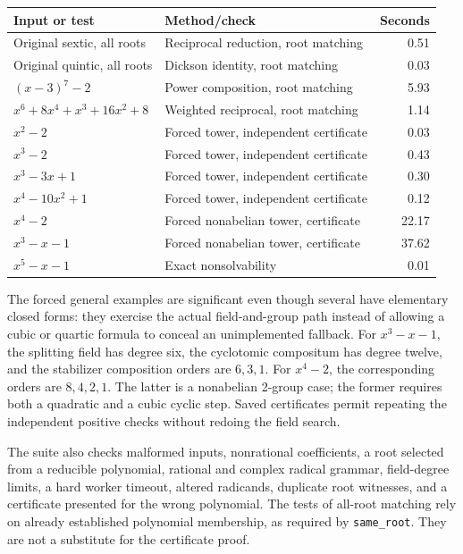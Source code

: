 \documentclass[11pt,a4paper]{article}
\theoremstyle{definition}
\theoremstyle{remark}
\newcommand{\code}[1]{\texttt{#1}}
\begin{document}
\begin{center}\small
\begin{tabular}{@{}p{}p{}r@{}}
\toprule
Input or test & Method/check & Seconds\\
\midrule
Original sextic, all roots & Reciprocal reduction, root matching & 0.51\\
Original quintic, all roots & Dickson identity, root matching & 0.03\\
$(x-3)^7-2$ & Power composition, root matching & 5.93\\
$x^6+8x^4+x^3+16x^2+8$ & Weighted reciprocal, root matching & 1.14\\
$x^2-2$ & Forced tower, independent certificate & 0.03\\
$x^3-2$ & Forced tower, independent certificate & 0.43\\
$x^3-3x+1$ & Forced tower, independent certificate & 0.30\\
$x^4-10x^2+1$ & Forced tower, independent certificate & 0.12\\
$x^4-2$ & Forced nonabelian tower, certificate & 22.17\\
$x^3-x-1$ & Forced nonabelian tower, certificate & 37.62\\
$x^5-x-1$ & Exact nonsolvability & 0.01\\
\bottomrule
\end{tabular}
\end{center}

The forced general examples are significant even though several have elementary
closed forms: they exercise the actual field-and-group path instead of allowing
a cubic or quartic formula to conceal an unimplemented fallback. For
$x^3-x-1$, the splitting field has degree six, the cyclotomic compositum has
degree twelve, and the stabilizer composition orders are $6,3,1$. For
$x^4-2$, the corresponding orders are $8,4,2,1$. The latter is a nonabelian
2-group case; the former requires both a quadratic and a cubic cyclic step.
Saved certificates permit repeating the independent positive checks without
redoing the field search.

The suite also checks malformed inputs, nonrational coefficients, a root
selected from a reducible polynomial, rational and complex radical grammar,
field-degree limits, a hard worker timeout, altered radicands, duplicate root
witnesses, and a certificate presented for the wrong polynomial. The tests of
all-root matching rely on already established polynomial membership, as
required by \code{same\_root}. They are not a substitute for the certificate
proof.
\end{document}
